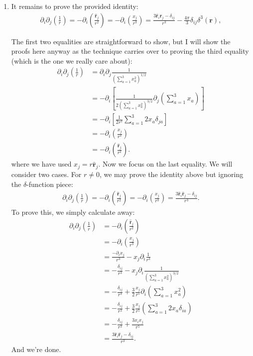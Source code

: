 \documentclass{article}
\theoremstyle{definition}
\newcommand{\p}{\partial}
\newcommand{\f}[2]{\frac{#1}{#2}}
\newcommand{\lp}{\left(}
\newcommand{\rp}{\right)}
\newcommand{\lb}{\left[}
\newcommand{\rb}{\right]}
\begin{document}
\begin{enumerate}[label=(\alph*)]
	
	
	\item It remains to prove the provided identity:
	\begin{align*}
	\p_i \p_j \lp \f{1}{r} \rp = -\p_i \lp \f{\hat{\bm{r}}_j}{r^2} \rp = -\p_i \lp \f{x_j}{r^3} \rp = \f{3 \hat{\bm{r}}_i \hat{\bm{r}}_j - \delta_{ij}}{r^3} - \f{4\pi}{3} \delta_{ij} \delta^3(\bm{r}),
	\end{align*}
	
	The first two equalities are straightforward to show, but I will show the proofs here anyway as the technique carries over to proving the third equality (which is the one we really care about):
	\begin{align*}
	\p_i \p_j \lp \f{1}{r} \rp 
	&= \p_i \p_j \f{1}{\lp \sum_{a=1}^3 x_a^2 \rp^{1/2}} \\
	&= -\p_i\lb \f{1}{2\lp \sum_{a=1}^3 x_a^2 \rp^{3/2}} \p_j \lp \sum_{a=1}^3  x_a\rp\rb\\
	&= -\p_i\lb \f{1}{2r^3} \sum_{a=1}^3 2x_a \delta_{ja}\rb\\
	&= -\p_i\lp \f{x_j}{r^3} \rp\\
	&= -\p_i\lp \f{\hat{\bm{r}}_j}{r^2} \rp.
	\end{align*}
	where we have used $x_j = r \hat{\bm{r}}_j$. Now we focus on the last equality. We will consider two cases. For $r\neq 0$, we may prove the identity above but ignoring the $\delta$-function piece: 
	\begin{align*}
	\p_i \p_j \lp \f{1}{r} \rp = -\p_i \lp \f{\hat{\bm{r}}_j}{r^2} \rp = -\p_i \lp \f{x_j}{r^3} \rp = \f{3 \hat{\bm{r}}_i \hat{\bm{r}}_j - \delta_{ij}}{r^3}.
	\end{align*}
	To prove this, we simply calculate away:
	\begin{align*}
	\p_i \p_j \lp \f{1}{r} \rp &= -\p_i \lp \f{\hat{\bm{r}}_j}{r^2} \rp \\
	&= -\p_i \lp \f{x_j}{r^3} \rp \\
	&= \f{-\p_i x_j}{r^3} - x_j \p_i \f{1}{r^3}\\
	&= -\f{\delta_{ij}}{r^3} - x_j \p_i \f{1}{\lp \sum_{a=1}^3 x_a^2 \rp^{3/2}}\\
	&= -\f{\delta_{ij}}{r^3} + \f{3}{2} \f{x_j}{r^5} \p_i \lp \sum_{a=1}^3 x_a^2 \rp\\
	&= -\f{\delta_{ij}}{r^3} + \f{3}{2} \f{x_j}{r^5} \lp \sum_{a=1}^3 2 x_a \delta_{ia} \rp\\
	&= -\f{\delta_{ij}}{r^3} + \f{3 x_i x_j}{r^5}\\
	&= \f{3 \hat{\bm{r}}_i \hat{\bm{r}}_j - \delta_{ij}}{r^3}.
	\end{align*}
	And we're done. 
	

\end{enumerate}
\end{document}
